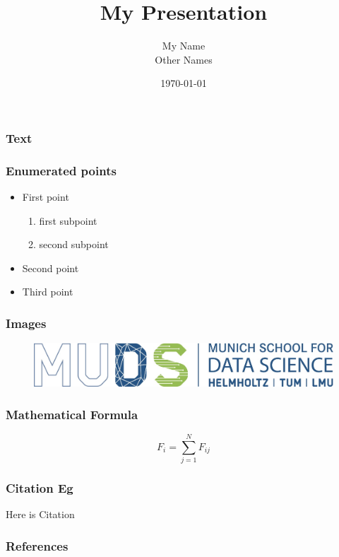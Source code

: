 \documentclass[usenames,dvipsnames]{beamer}
\title{My Presentation} %
\author{My Name \\ Other Names}
\institute{My Insitute}
\date{\today}
\begin{document}


\begin{frame}
	\frametitle{Text}
	\blindtext
\end{frame}

\begin{frame}
\frametitle{Enumerated points}
\begin{itemize}
	\item First point
	\begin{enumerate}[-]
		\item first subpoint
		\item second subpoint
	\end{enumerate}
	\item Second point
	\item Third point
\end{itemize}
\end{frame}

\begin{frame}
	\frametitle{Images}
	\begin{figure}
		\center
		\includegraphics[width=\textwidth]{./figure/logo/muds_logo.jpg}
	\end{figure}
\end{frame}

\begin{frame}
	\frametitle{Mathematical Formula}
	$$F_i = \sum_{j=1}^{N} F_{ij}$$
\end{frame}

\begin{frame}
	\frametitle{Citation Eg}
	Here is Citation \cite{perdikaris2017nonlinear}
\end{frame}

\begin{frame}[t, allowframebreaks]
	\frametitle{References}
\printbibliography
\end{frame}
\end{document}
